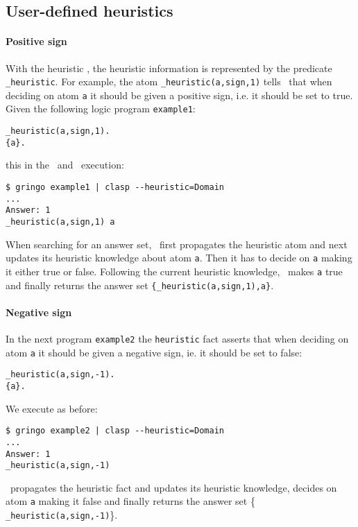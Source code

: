 \subsection{User-defined heuristics}

\paragraph{Positive sign}

With the heuristic , the heuristic information is represented by the predicate \texttt{\_heuristic}.
For example, the atom \texttt{\_heuristic(a,sign,1)} tells  \clasp\ that  when deciding on atom \texttt{a}
it should be given a positive sign, i.e. it should be set to true.
Given the following logic program \texttt{example1}:
\begin{lstlisting}[numbers=none]
_heuristic(a,sign,1).
{a}.
\end{lstlisting}
this in the \gringo\ and \clasp\ execution:
\begin{lstlisting}[numbers=none]
$ gringo example1 | clasp --heuristic=Domain
...
Answer: 1
_heuristic(a,sign,1) a
\end{lstlisting}

When searching for an answer set, \clasp\ first propagates the heuristic atom and next updates its heuristic knowledge about atom \texttt{a}.
Then it has to decide on \texttt{a} making it either true or false.
Following the current heuristic knowledge,  \clasp\ makes \texttt{a} true and finally returns the answer set \texttt{\{\_heuristic(a,sign,1),a\}}.

\paragraph{Negative sign}

In the next program \texttt{example2} the \texttt{heuristic} fact  asserts that when deciding on atom \texttt{a}
it should be given a negative sign, ie. it should be set to false:
\begin{lstlisting}[numbers=none]
_heuristic(a,sign,-1).
{a}.
\end{lstlisting}
We execute as before:
\begin{lstlisting}[numbers=none]
$ gringo example2 | clasp --heuristic=Domain
...
Answer: 1
_heuristic(a,sign,-1)
\end{lstlisting}
\clasp\ propagates the heuristic fact and updates its heuristic knowledge,
decides on atom \texttt{a} making it false and finally returns the answer set \{ \texttt{\_heuristic(a,sign,-1)}\}.


